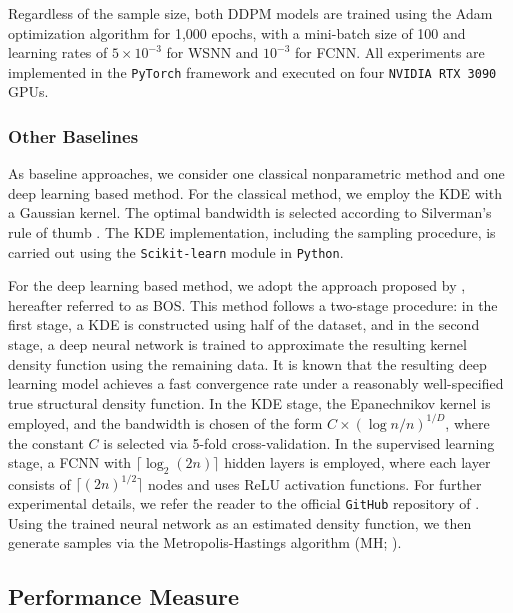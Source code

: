 \documentclass[twoside,11pt]{article}
\begin{document}
Regardless of the sample size, both DDPM models are trained using the Adam optimization algorithm \citep{kingma2014adam} for 1,000 epochs, with a mini-batch size of 100 and learning rates of $5 \times 10^{-3}$ for WSNN and $10^{-3}$ for FCNN. All experiments are implemented in the \texttt{PyTorch} framework and executed on four \texttt{NVIDIA RTX 3090} GPUs.

\subsubsection{Other Baselines}


As baseline approaches, we consider one classical nonparametric method and one deep learning based method. For the classical method, we employ the KDE with a Gaussian kernel. The optimal bandwidth is selected according to Silverman’s rule of thumb \citep{silverman2018density}. The KDE implementation, including the sampling procedure, is carried out using the \texttt{Scikit-learn} module in \texttt{Python}. 

For the deep learning based method, we adopt the approach proposed by \citet{bos2024supervised}, hereafter referred to as BOS. This method follows a two-stage procedure: in the first stage, a KDE is constructed using half of the dataset, and in the second stage, a deep neural network is trained to approximate the resulting kernel density function using the remaining data. It is known that the resulting deep learning model achieves a fast convergence rate under a reasonably well-specified true structural density function.
In the KDE stage, the Epanechnikov kernel is employed, and the bandwidth is chosen of the form $C \times (\log n / n)^{1/D}$, where the constant $C$ is selected via 5-fold cross-validation.
In the supervised learning stage, a FCNN with $\lceil \log_2 (2n) \rceil$ hidden layers is employed, where each layer consists of $\lceil (2n)^{1/2} \rceil$ nodes and uses ReLU activation functions.
For further experimental details, we refer the reader to the official \texttt{GitHub} repository of \citet{bos2024supervised}.
Using the trained neural network as an estimated density function, we then generate samples via the Metropolis-Hastings algorithm (MH; \citealp{metropolis1953equation, hastings1970monte}).



\subsection{Performance Measure} 
\end{document}
